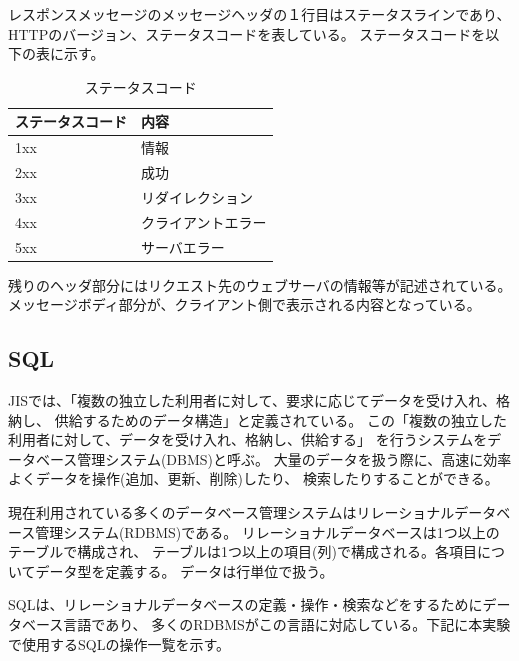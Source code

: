 \documentclass[12pt]{jarticle}
\begin{document}
レスポンスメッセージのメッセージヘッダの１行目はステータスラインであり、
HTTPのバージョン、ステータスコードを表している。
ステータスコードを以下の表に示す。
\begin{table}[htb]
    \begin{center}
        \caption{ステータスコード}
        \begin{tabular}{|l|l|}
            \hline
            ステータスコード & 内容               \\
            \hline
            1xx              & 情報               \\
            2xx              & 成功               \\
            3xx              & リダイレクション   \\
            4xx              & クライアントエラー \\
            5xx              & サーバエラー       \\
            \hline
        \end{tabular}
    \end{center}
\end{table}

残りのヘッダ部分にはリクエスト先のウェブサーバの情報等が記述されている。
メッセージボディ部分が、クライアント側で表示される内容となっている。

\subsection{SQL}
JISでは、「複数の独立した利用者に対して、要求に応じてデータを受け入れ、格納し、
供給するためのデータ構造」と定義されている。
この「複数の独立した利用者に対して、データを受け入れ、格納し、供給する」
を行うシステムをデータベース管理システム(DBMS)と呼ぶ。
大量のデータを扱う際に、高速に効率よくデータを操作(追加、更新、削除)したり、
検索したりすることができる。

現在利用されている多くのデータベース管理システムはリレーショナルデータベース管理システム(RDBMS)である。
リレーショナルデータベースは1つ以上のテーブルで構成され、
テーブルは1つ以上の項目(列)で構成される。各項目についてデータ型を定義する。
データは行単位で扱う。

SQLは、リレーショナルデータベースの定義・操作・検索などをするためにデータベース言語であり、
多くのRDBMSがこの言語に対応している。下記に本実験で使用するSQLの操作一覧を示す。
\end{document}
